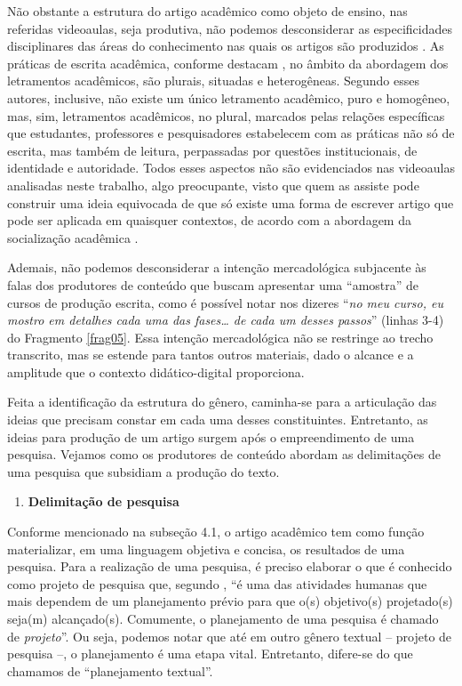 Não obstante a estrutura do artigo acadêmico como objeto de ensino, nas
referidas videoaulas, seja produtiva, não podemos desconsiderar as
especificidades disciplinares das áreas do conhecimento nas quais os
artigos são produzidos \cite{pereira2019}. As práticas de escrita
acadêmica, conforme destacam \cite{lea1998}, no âmbito da abordagem
dos letramentos acadêmicos, são plurais, situadas e heterogêneas.
Segundo esses autores, inclusive, não existe um único letramento
acadêmico, puro e homogêneo, mas, sim, letramentos acadêmicos, no
plural, marcados pelas relações específicas que estudantes, professores
e pesquisadores estabelecem com as práticas não só de escrita, mas
também de leitura, perpassadas por questões institucionais, de
identidade e autoridade. Todos esses aspectos não são evidenciados nas
videoaulas analisadas neste trabalho, algo preocupante, visto que quem
as assiste pode construir uma ideia equivocada de que só existe uma
forma de escrever artigo que pode ser aplicada em quaisquer contextos,
de acordo com a abordagem da socialização acadêmica \cite{lea1998}.

Ademais, não podemos desconsiderar a intenção mercadológica subjacente
às falas dos produtores de conteúdo que buscam apresentar uma
``amostra'' de cursos de produção escrita, como é possível notar nos
dizeres ``\emph{no meu curso, eu mostro em detalhes cada uma das
fases\ldots{} de cada um desses passos}'' (linhas 3-4) do Fragmento \ref{frag05}.
Essa intenção mercadológica não se restringe ao trecho transcrito, mas
se estende para tantos outros materiais, dado o alcance e a amplitude
que o contexto didático-digital proporciona.

Feita a identificação da estrutura do gênero, caminha-se para a
articulação das ideias que precisam constar em cada uma desses
constituintes. Entretanto, as ideias para produção de um artigo surgem
após o empreendimento de uma pesquisa. Vejamos como os produtores de
conteúdo abordam as delimitações de uma pesquisa que subsidiam a
produção do texto.

\begin{enumerate}
\def\labelenumi{\arabic{enumi}.}
\setcounter{enumi}{2}
\item
  \textbf{Delimitação de pesquisa}
\end{enumerate}

Conforme mencionado na subseção 4.1, o artigo acadêmico tem como função
materializar, em uma linguagem objetiva e concisa, os resultados de uma
pesquisa. Para a realização de uma pesquisa, é preciso elaborar o que é
conhecido como projeto de pesquisa que, segundo \textcite[p.~51—52, grifo das autoras]{motta-roth2010}, ``é uma das atividades humanas que
mais dependem de um planejamento prévio para que o(s) objetivo(s)
projetado(s) seja(m) alcançado(s). Comumente, o planejamento de uma
pesquisa é chamado de \emph{projeto}''. Ou seja, podemos notar que até
em outro gênero textual -- projeto de pesquisa --, o planejamento é uma
etapa vital. Entretanto, difere-se do que chamamos de ``planejamento
textual''.

